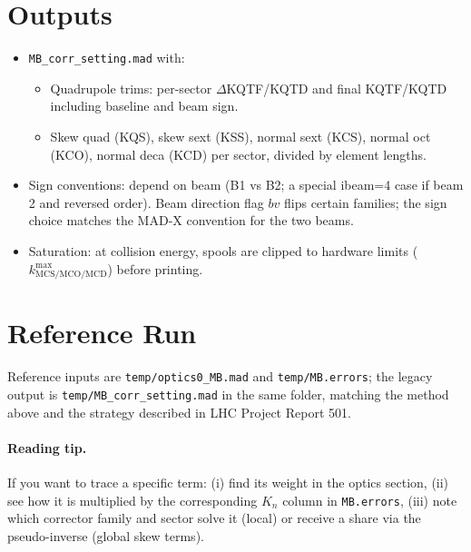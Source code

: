 \documentclass[11pt]{article}
\begin{document}
\section{Outputs}
\begin{itemize}
  \item \texttt{MB\_corr\_setting.mad} with:
\begin{itemize}
  \item Quadrupole trims: per-sector $\Delta$KQTF/KQTD and final KQTF/KQTD including baseline and beam sign.
  \item Skew quad (KQS), skew sext (KSS), normal sext (KCS), normal oct (KCO), normal deca (KCD) per sector, divided by element lengths.
\end{itemize}
  \item Sign conventions: depend on beam (B1 vs B2; a special ibeam=4 case if beam 2 and reversed order). Beam direction flag $bv$ flips certain families; the sign choice matches the MAD-X convention for the two beams.
  \item Saturation: at collision energy, spools are clipped to hardware limits ($k^{\max}_{\mathrm{MCS/MCO/MCD}}$) before printing.
\end{itemize}

\section{Reference Run}
Reference inputs are \texttt{temp/optics0\_MB.mad} and \texttt{temp/MB.errors}; the legacy output is \texttt{temp/MB\_corr\_setting.mad} in the same folder, matching the method above and the strategy described in LHC Project Report 501.

\paragraph{Reading tip.} If you want to trace a specific term: (i) find its weight in the optics section, (ii) see how it is multiplied by the corresponding $K_n$ column in \texttt{MB.errors}, (iii) note which corrector family and sector solve it (local) or receive a share via the pseudo-inverse (global skew terms).
\end{document}
